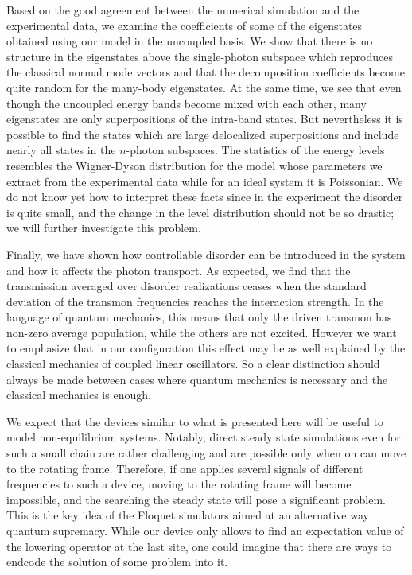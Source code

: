 \documentclass[%
 aps, pra,
 amsmath,amssymb,
 reprint,%
superscriptaddress
]{revtex4-2}
\begin{document}
Based on the good agreement between the numerical simulation and the experimental data, we examine the coefficients of some of the eigenstates obtained using our model in the uncoupled basis. We show that there is no structure in the eigenstates above the single-photon subspace which reproduces the classical normal mode vectors and that the decomposition coefficients become quite random for the many-body eigenstates. At the same time, we see that even though the uncoupled energy bands become mixed with each other, many eigenstates are only superpositions of the intra-band states. But nevertheless it is possible to find the states which are large delocalized superpositions and include nearly all states in the $n$-photon subspaces. The statistics of the energy levels resembles the Wigner-Dyson distribution for the model whose parameters we extract from the experimental data while for an ideal system it is Poissonian. We do not know yet how to interpret these facts since in the experiment the disorder is quite small, and the change in the level distribution should not be so drastic; we will further investigate this problem.

Finally, we have shown how controllable disorder can be introduced in the system and how it affects the photon transport. As expected, we find that the transmission averaged over disorder realizations ceases when the standard deviation of the transmon frequencies reaches the interaction strength. In the language of quantum mechanics, this means that only the driven transmon has non-zero average population, while the others are not excited. However we want to emphasize that in our configuration this effect may be as well explained by the classical mechanics of coupled linear oscillators. So a clear distinction should always be made between cases where quantum mechanics is necessary and the classical mechanics is enough.

We expect that the devices similar to what is presented here will be useful to model non-equilibrium systems. Notably, direct steady state simulations even for such a small chain are rather challenging and are possible only when on can move to the rotating frame. Therefore, if one applies several signals of different frequencies to such a device, moving to the rotating frame will become impossible, and the searching the steady state will pose a significant problem. This is the key idea of the Floquet simulators aimed at an alternative way quantum supremacy. While our device only allows to find an expectation value of the lowering operator at the last site, one could imagine that there are ways to endcode the solution of some problem into it.
\end{document}
